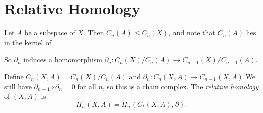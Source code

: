 \section{Relative Homology}
\begin{remark}
  Let $A$ be a subspace of $X$. Then $C_n(A) \le C_n(X)$,
  and note that $C_n(A)$ lies in the kernel of
  \begin{center}
  \end{center}
  So $\partial_n$ induces a homomorphism
  $\partial_n : C_n(X) / C_n(A) \to C_{n - 1}(X) / C_{n - 1}(A)$.
\end{remark}

\begin{definition}
  Define $C_n(X, A) = C_n(X) / C_n(A)$ and
  $\partial_n : C_n(X, A) \to C_{n - 1}(X, A)$
  We still have $\partial_{n - 1} \circ \partial_n = 0$
  for all $n$, so this is a chain complex.
  The \emph{relative homology} of $(X, A)$ is
  \[
    H_n(X, A) = H_n(C_*(X, A), \partial).
  \]
\end{definition}
